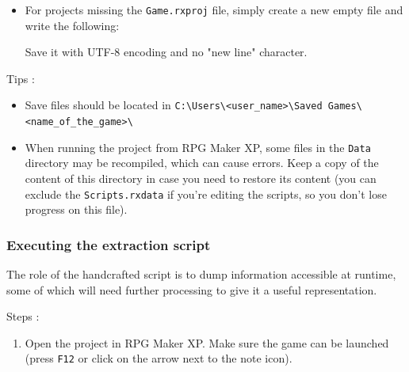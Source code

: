 \documentclass[11pt]{article}
\begin{document}
{\begin{itemize}
	I used \texttt{RGSS Tool}\footnote{https://gitlab.com/rgss/rgsstool} :
	
	\begin{lstlisting}
	python rgsstool.py -x -d "path\for\output\files" "path\of\rgssad\file"\end{lstlisting}
	\vspace{-8mm}
	
	This worked with Python 3.x, google search it if you're not sure if you have a recent version of Python and how to launch it on your computer.
	
	Exemple for Pokemon Uranium when command line is at root :
	
	\begin{lstlisting}
	python rgsstool.py -x -d . Uranium.rgssad\end{lstlisting}
	\vspace{-6mm}
	
	\item For projects missing the \verb|Game.rxproj| file, simply create a new empty file and write the following: 
	
	
	Save it with UTF-8 encoding and no "new line" character.
\end{itemize}

\newpage 
Tips :
\begin{itemize}
	\item Save files should be located in \verb|C:\Users\<user_name>\Saved Games\<name_of_the_game>\|
	
	\item When running the project from RPG Maker XP, some files in the \verb|Data| directory may be recompiled, which can cause errors. Keep a copy of the content of this directory in case you need to restore its content (you can exclude the \verb|Scripts.rxdata| if you're editing the scripts, so you don't lose progress on this file).
\end{itemize}
\hfill

\subsubsection{Executing the extraction script}

The role of the handcrafted script is to dump information accessible at runtime, some of which will need further processing to give it a useful representation.

Steps :
\begin{enumerate}
	\item Open the project in RPG Maker XP. Make sure the game can be launched (press \verb|F12| or click on the arrow next to the note icon).
	

\end{enumerate}}
\end{document}
